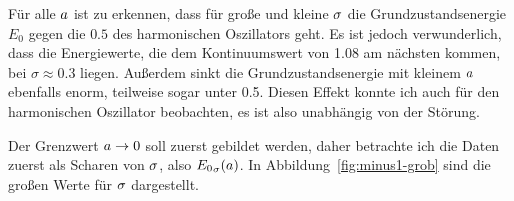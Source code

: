 Für alle $a$ ist zu erkennen, dass für große und kleine $\sigma$
die Grundzustandsenergie $E_0$ gegen die $\num{0.5}$ des harmonischen
Oszillators geht. Es ist jedoch verwunderlich, dass die Energiewerte, die dem
Kontinuumswert von \num{1.08} am nächsten kommen, bei $\sigma \approx
\num{0.3}$ liegen. Außerdem sinkt die Grundzustandsenergie mit kleinem
$a$ ebenfalls enorm, teilweise sogar unter \num{0.5}. Diesen Effekt
konnte ich auch für den harmonischen Oszillator beobachten, es ist also
unabhängig von der Störung.

Der Grenzwert $a \to 0$ soll zuerst gebildet werden, daher betrachte
ich die Daten zuerst als Scharen von $\sigma$, also
${E_0}_\sigma(a)$. In Abbildung~\ref{fig:minus1-grob} sind die
großen Werte für $\sigma$ dargestellt.


